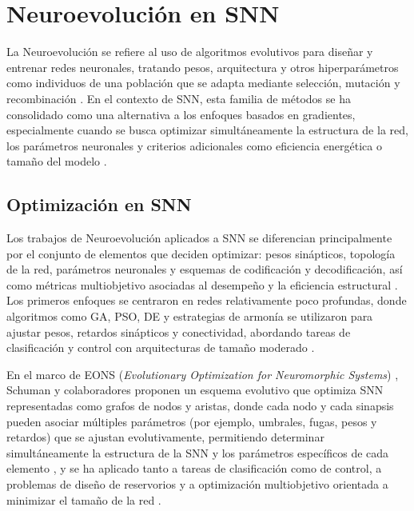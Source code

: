 
\section{Neuroevolución en SNN}
La Neuroevolución se refiere al uso de algoritmos evolutivos para diseñar y entrenar redes neuronales, tratando pesos, arquitectura y otros hiperparámetros como individuos de una población que se adapta mediante selección, mutación y recombinación \cite{Schuman2020evooptineuro, Shen2024EvolutionarySNN}. En el contexto de SNN, esta familia de métodos se ha consolidado como una alternativa a los enfoques basados en gradientes, especialmente cuando se busca optimizar simultáneamente la estructura de la red, los parámetros neuronales y criterios adicionales como eficiencia energética o tamaño del modelo \cite{Shen2024EvolutionarySNN, Schuman2022Opportunities}.

\subsection{Optimización en SNN}
Los trabajos de Neuroevolución aplicados a SNN se diferencian principalmente por el conjunto de elementos que deciden optimizar: pesos sinápticos, topología de la red, parámetros neuronales y esquemas de codificación y decodificación, así como métricas multiobjetivo asociadas al desempeño y la eficiencia estructural \cite{Schliebs2013snn-survey, Jin2007evo-multi-snn}. Los primeros enfoques se centraron en redes relativamente poco profundas, donde algoritmos como GA, PSO, DE y estrategias de armonía se utilizaron para ajustar pesos, retardos sinápticos y conectividad, abordando tareas de clasificación y control con arquitecturas de tamaño moderado \cite{Shen2024EvolutionarySNN}.

En el marco de EONS (\textit{Evolutionary Optimization for Neuromorphic Systems}) \cite{Schuman2020evooptineuro}, Schuman y colaboradores proponen un esquema evolutivo que optimiza SNN representadas como grafos de nodos y aristas, donde cada nodo y cada sinapsis pueden asociar múltiples parámetros (por ejemplo, umbrales, fugas, pesos y retardos) que se ajustan evolutivamente, permitiendo determinar simultáneamente la estructura de la SNN y los parámetros específicos de cada elemento \cite{Schuman2020evooptineuro}, y se ha aplicado tanto a tareas de clasificación como de control, a problemas de diseño de reservorios y a optimización multiobjetivo orientada a minimizar el tamaño de la red \cite{Schuman2022Opportunities}.


